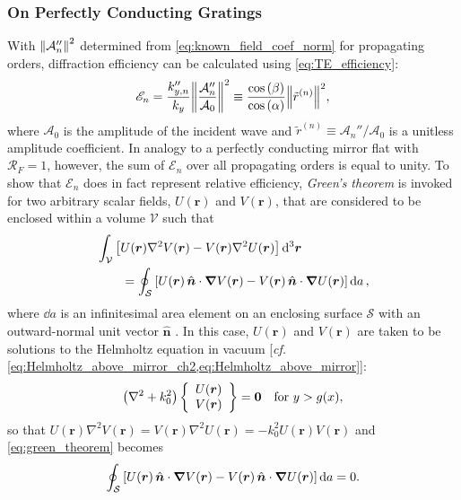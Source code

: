 \subsubsection{On Perfectly Conducting Gratings}\label{sec:rel_eff_perf} 
With $\norm{\mathcal{A}_n''}^2$ determined from \cref{eq:known_field_coef_norm} for propagating orders, diffraction efficiency can be calculated using \cref{eq:TE_efficiency}: 
\begin{equation}\label{eq:rel_efficiency}
 \mathscr{E}_n = \frac{k_{y,n}''}{k_y} \norm{\frac{\mathcal{A}_n''}{\mathcal{A}_0}}^2 \equiv \frac{\cos \left( \beta \right)}{\cos \left( \alpha \right)} \norm{\tilde{r}^{(n)}}^2 ,
\end{equation}
where $\mathcal{A}_0$ is the amplitude of the incident wave and $\tilde{r}^{(n)} \equiv \mathcal{A}_n'' / \mathcal{A}_0$ is a unitless amplitude coefficient. 
In analogy to a perfectly conducting mirror flat with $\mathcal{R}_F = 1$, however, the sum of $\mathscr{E}_n$ over all propagating orders is equal to unity. 
To show that $\mathscr{E}_n$ does in fact represent relative efficiency, \emph{Green's theorem} is invoked for two arbitrary scalar fields, $U(\mathbold{r})$ and $V(\mathbold{r})$, that are considered to be enclosed within a volume $\mathcal{V}$ such that \cite{Petit80}
\begin{align}\label{eq:green_theorem}
 \begin{split}
 &\int_{\mathcal{V}} \left[ U(\mathbold{r}) \nabla^2 V(\mathbold{r}) - V(\mathbold{r}) \nabla^2 U(\mathbold{r}) \right] \dd[3]{\mathbold{r}} \\
 &\quad \quad = \oint_{\mathcal{S}} \left[ U(\mathbold{r}) \, \mathbold{\hat{n}} \cdot \grad{V(\mathbold{r})} - V(\mathbold{r}) \, \mathbold{\hat{n}} \cdot \grad{U(\mathbold{r})} \right] \dd{a}, 
 \end{split}
 \end{align}
where $\dd{a}$ is an infinitesimal area element on an enclosing surface $\mathcal{S}$ with an outward-normal unit vector $\mathbold{\hat{n}}$ \cite{Jackson75}. 
In this case, $U(\mathbold{r})$ and $V(\mathbold{r})$ are taken to be solutions to the Helmholtz equation in vacuum [\emph{cf.\@} \cref{eq:Helmholtz_above_mirror_ch2,eq:Helmholtz_above_mirror}]:
\begin{equation} 
 \left( \laplacian + k_0^2 \right) \left\{
 \begin{array}{lr}
 U(\mathbold{r})\\
 V(\mathbold{r})
 \end{array}
 \right\} = \mathbf{0} \quad \text{for } y > g(x) ,
 \end{equation}
so that $U(\mathbold{r}) \nabla^2 V(\mathbold{r}) = V(\mathbold{r}) \nabla^2 U(\mathbold{r}) = - k_0^2 U(\mathbold{r}) V(\mathbold{r})$ and \cref{eq:green_theorem} becomes
\begin{equation}\label{eq:green_theorem_mod1}
 \oint_{\mathcal{S}} \left[ U(\mathbold{r}) \, \mathbold{\hat{n}} \cdot \grad{V(\mathbold{r})} - V(\mathbold{r}) \, \mathbold{\hat{n}} \cdot \grad{U(\mathbold{r})} \right] \dd{a} = 0 .
 \end{equation}

